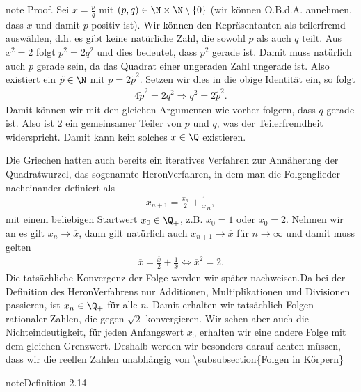 \documentclass[letterpaper,10pt,english]{jupyterBook}
\begin{document}
\begin{sphinxadmonition}{note}
Proof.  Sei \(x = \frac{p}q\) mit \((p,q) \in \N \times \N \setminus \{0\}\) (wir können O.B.d.A. annehmen, dass \(x\) und damit \(p\) positiv ist). Wir können den Repräsentanten als teilerfremd auswählen, d.h. es gibt keine natürliche Zahl, die sowohl \(p\) als auch \(q\) teilt. Aus \(x^2 =2\) folgt \(p^2 = 2 q^2\) und dies bedeutet, dass \(p^2\) gerade ist. Damit muss natürlich auch \(p\) gerade sein, da das Quadrat einer ungeraden Zahl ungerade ist. Also existiert ein \(\tilde p \in \N\) mit \(p = 2 \tilde p^2\). Setzen wir dies in die obige Identität ein, so folgt
\begin{equation*}
\begin{split} 4 \tilde p^2 = 2 q^2 \Rightarrow q^2 = 2 \tilde p^2.\end{split}
\end{equation*}
Damit können wir mit den gleichen Argumenten wie vorher folgern, dass \(q\) gerade ist. Also ist \(2\) ein gemeinsamer Teiler von \(p\) und \(q\), was der Teilerfremdheit widerspricht. Damit kann kein solches \(x \in \Q\) existieren.

Die Griechen hatten auch bereits ein iteratives Verfahren zur Annäherung der Quadratwurzel, das sogenannte Heron\sphinxhyphen{}Verfahren, in dem man die Folgenglieder nacheinander definiert als
\begin{equation*}
\begin{split} x_{n+1}=\frac{x_n}2 + \frac{1}x_n,\end{split}
\end{equation*}
mit einem beliebigen Startwert \(x_0 \in \Q_+\), z.B. \(x_0=1\) oder \(x_0=2\). Nehmen wir an es gilt \(x_n \rightarrow \overline{x}\), dann gilt natürlich auch \( x_{n+1} \rightarrow \overline{x}\) für \(n\rightarrow \infty\) und damit muss gelten
\begin{equation*}
\begin{split} \overline{x}=\frac{\overline{x}}2 + \frac{1}{\overline{x}} \Leftrightarrow \overline{x}^2=2.\end{split}
\end{equation*}
Die tatsächliche Konvergenz der Folge werden wir später nachweisen.Da bei der Definition des Heron\sphinxhyphen{}Verfahrens nur Additionen, Multiplikationen und Divisionen passieren, ist \(x_n \in \Q_+\) für alle \(n\). Damit erhalten wir tatsächlich Folgen rationaler Zahlen, die gegen \(\sqrt{2}\) konvergieren. Wir sehen aber auch die Nichteindeutigkeit, für jeden Anfangswert \(x_0\) erhalten wir eine andere Folge mit dem gleichen Grenzwert. Deshalb werden wir besonders darauf achten müssen, dass wir die reellen Zahlen unabhängig von
\textbackslash{}subsubsection\{Folgen in Körpern\}
\label{grundlagen/zahlensysteme:definition-13}
\begin{sphinxadmonition}{note}{Definition 2.14}




\end{sphinxadmonition}
\end{sphinxadmonition}
\end{document}

